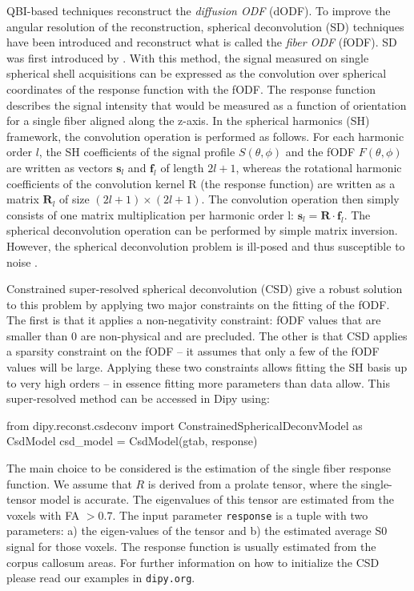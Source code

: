 \documentclass{bioinfo}
\begin{document}
QBI-based techniques reconstruct the \emph{diffusion
  ODF} (dODF). To improve the angular resolution of the reconstruction, spherical
deconvolution (SD) techniques have been introduced and reconstruct what is
called the \emph{fiber ODF} (fODF).
SD was first introduced by \citet{tournier-calamante-etal:04}. With
this method, the signal measured on single spherical shell
acquisitions can be expressed as the convolution over spherical coordinates of
the response function with the fODF. The response
function describes the signal intensity that would be measured as a function of
orientation for a single fiber aligned along the z-axis. In the spherical
harmonics (SH) framework, the convolution operation is performed as
follows. For each harmonic order $l$, the SH coefficients of the signal profile
$S(\theta, \phi)$ and the fODF $F(\theta, \phi)$ are written as vectors
$\mathbf{s}_l$ and $\mathbf{f}_l$ of length $2l+1$, whereas the rotational
harmonic coefficients of the convolution kernel R (the response function) are
written as a matrix $\mathbf{R}_l$ of size $(2l+ 1)\times(2l+ 1)$. The
convolution operation then simply consists of one matrix multiplication per
harmonic order l: $\mathbf{s}_l=\mathbf{R}\cdot\mathbf{f}_l$. The spherical
deconvolution operation can be performed by simple matrix inversion. However,
the spherical deconvolution problem is ill-posed and thus susceptible
to noise \citep{tournier-calamante-etal:04}.

Constrained super-resolved spherical deconvolution (CSD)
\citet{tournier-calamante-etal:07} give a robust solution to this problem by
applying two major constraints on the fitting of the fODF. The first is that it
applies a non-negativity constraint: fODF values that are smaller than 0 are
non-physical and are precluded. The other is that CSD applies a sparsity
constraint on the fODF -- it assumes that only a few of the fODF values will be
large. Applying these two constraints allows fitting the SH basis
up to very high orders -- in essence fitting more parameters than data allow.
This super-resolved method can be accessed in Dipy using:
\begin{python}
from dipy.reconst.csdeconv import
        ConstrainedSphericalDeconvModel as CsdModel
csd_model = CsdModel(gtab, response)
\end{python}
The main choice to be considered is the estimation of the single fiber response
function.  We assume that $R$ is derived from a prolate tensor, where
the single-tensor model is accurate. The eigenvalues
of this tensor are estimated from the voxels with FA $> 0.7$. The input
parameter \texttt{response} is a tuple with two parameters: a) the eigen-values
of the tensor and b) the estimated average S0 signal for those voxels. The
response function is usually estimated from the corpus callosum areas. For
further information on how to initialize the CSD please read our examples in
\texttt{dipy.org}.
\end{document}
